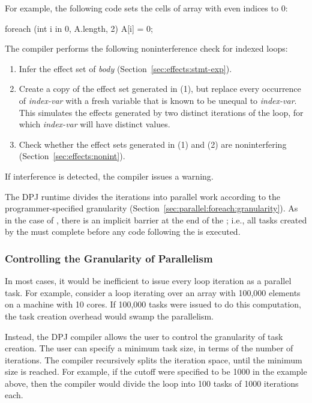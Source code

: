For example, the following code sets the cells of array  with
even indices to 0:

\begin{dpjlisting}
foreach (int i in 0, A.length, 2) {
  A[i] = 0;
}
\end{dpjlisting}

The compiler performs the following noninterference check for indexed
 loops:
\begin{enumerate}
\item Infer the effect set of \emph{body}
  (Section~\ref{sec:effects:stmt-exp}).
\item Create a copy of the effect set generated in (1), but replace
  every occurrence of \emph{index-var} with a fresh variable that is
  known to be unequal to \emph{index-var}.  This simulates the effects
  generated by two distinct iterations of the loop, for which
  \emph{index-var} will have distinct values.
\item Check whether the effect sets generated in (1) and (2) are
  noninterfering (Section~\ref{sec:effects:nonint}).
\end{enumerate}
If interference is detected, the compiler issues a warning.

The DPJ runtime divides the  iterations into parallel
work according to the programmer-specified granularity
(Section~\ref{sec:parallel:foreach:granularity}).  As in the case of
, there is an implicit barrier at the end of the
; i.e., all tasks created by the  must
complete before any code following the  is executed.

\subsubsection{Controlling the Granularity of Parallelism%
\label{sec:parallel:foreach:granularity}}

In most cases, it would be inefficient to issue every loop iteration
as a parallel task.  For example, consider a loop iterating over an
array with 100,000 elements on a machine with 10 cores.  If 100,000
tasks were issued to do this computation, the task creation overhead
would swamp the parallelism.

Instead, the DPJ compiler allows the user to control the granularity
of task creation.  The user can specify a minimum task size, in terms
of the number of iterations.  The compiler recursively splits the
iteration space, until the minimum size is reached.  For example, if
the cutoff were specified to be 1000 in the example above, then the
compiler would divide the loop into 100 tasks of 1000 iterations
each.

